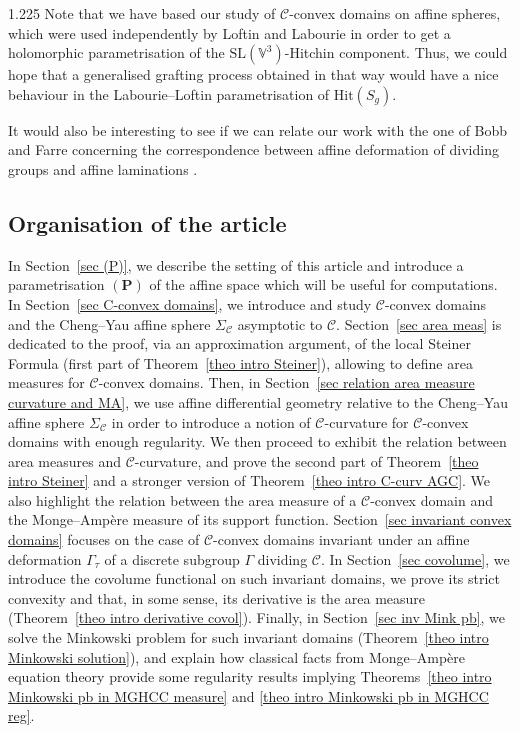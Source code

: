 \documentclass[reqno, a4paper]{amsart}
\numberwithin{equation}{section}
\numberwithin{figure}{section}
\theoremstyle{definition}
\theoremstyle{remark}
\newcommand{\V}{\mathbb{V}} %
\newcommand{\SL}{\mathrm{SL}} %
\newcommand{\C}{\mathcal{C}} %
\renewcommand{\S}{\Sigma_\C} %
\begin{document}
\begin{spacing}{1.225}
Note that we have based our study of $\C$-convex domains on affine spheres, which were used independently by Loftin \cite{Loftin_01} and Labourie \cite{Labourie_07} in order to get a holomorphic parametrisation of the $\SL(\V^3)$-Hitchin component. Thus, we could hope that a generalised grafting process obtained in that way would have a nice behaviour in the Labourie--Loftin parametrisation of $\mathrm{Hit}(S_g)$.




It would also be interesting to see if we can relate our work with the one of Bobb and Farre \cite{Bobb_Farre_24} concerning the correspondence between affine deformation of dividing groups and affine laminations \cite{Hatcher_Oertel_92}.


\subsection*{Organisation of the article} 

In Section~\ref{sec (P)}, we describe the setting of this article and introduce a parametrisation $(\mathbf{P})$ of the affine space which will be useful for computations. In Section~\ref{sec C-convex domains}, we introduce and study $\C$-convex domains and the Cheng--Yau affine sphere $\S$ asymptotic to $\C$. Section~\ref{sec area meas}
is dedicated to the proof, via an approximation argument, of the local Steiner Formula (first part of Theorem~\ref{theo intro Steiner}), allowing to define area measures for $\C$-convex domains. Then, in Section~\ref{sec relation area measure curvature and MA}, we use affine differential geometry relative to the Cheng--Yau affine sphere $\S$ in order to introduce a notion of $\C$-curvature for $\C$-convex domains with enough regularity. We then proceed to exhibit the relation between area measures and $\C$-curvature, and prove the second part of Theorem~\ref{theo intro Steiner} and a stronger version  of Theorem~\ref{theo intro C-curv AGC}. We also highlight the relation between the area measure of a $\C$-convex domain and the Monge--Amp\`ere measure of its support function. Section~\ref{sec invariant convex domains} focuses on the case of $\C$-convex domains invariant under an affine deformation $\Gamma_\tau$ of a discrete subgroup $\Gamma$ dividing $\C$. In Section~\ref{sec covolume}, we introduce the covolume functional on such invariant domains, we prove its strict convexity and that, in some sense, its derivative is the area measure (Theorem~\ref{theo intro derivative covol}). Finally, in Section~\ref{sec inv Mink pb}, we solve the Minkowski problem for such invariant domains (Theorem~\ref{theo intro Minkowski solution}), and explain how classical facts from Monge--Amp\`ere equation theory provide some regularity results implying Theorems~\ref{theo intro Minkowski pb in MGHCC measure} and \ref{theo intro Minkowski pb in MGHCC reg}. 


\end{spacing}
\end{document}
